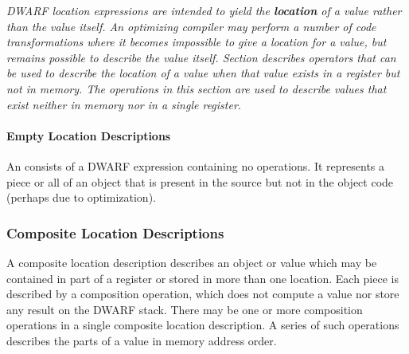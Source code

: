 \textit{DWARF location expressions are intended to yield the \textbf{location}
of a value rather than the value itself. An optimizing compiler
may perform a number of code transformations where it becomes
impossible to give a location for a value, but remains possible
to describe the value itself. 
Section 
describes operators that can be used to
describe the location of a value when that value exists in a
register but not in memory. The operations in this section are
used to describe values that exist neither in memory nor in a
single register.}

\paragraph{Empty Location Descriptions}

An 
consists of a DWARF expression
containing no operations. It represents a piece or all of an
object that is present in the source but not in the object code
(perhaps due to optimization).

\subsubsection{Composite Location Descriptions}
A composite location description describes an object or
value which may be contained in part of a register or stored
in more than one location. Each piece is described by a
composition operation, which does not compute a value nor
store any result on the DWARF stack. There may be one or
more composition operations in a single composite location
description. A series of such operations describes the parts
of a value in memory address order.

